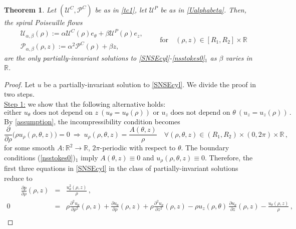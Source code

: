 \documentclass[a4paper,11pt]{amsart}
\newtheorem{theorem}{Theorem}[section]
\numberwithin{equation}{section}
\numberwithin{figure}{section}
\newcommand{\R}{\mathbb{R}}
\def\U{{\mathcal U}}
\def\P{{\mathcal P}}
\def\eq#1{(\ref{#1})}
\begin{document}
	\begin{theorem}\label{theo-tcg}
		Let $({\U^C},{\P^C})$ be as in \eqref{tc1}, let $\U^P$ be as in \eqref{Ualphabeta}. Then, the spiral Poiseuille flows 
		\begin{equation} \label{tcg}\begin{aligned}
				&\U_{\alpha,\beta}(\rho) := \alpha\U^C(\rho)e_\theta+ \beta\U^P(\rho)e_z,\\[5pt]
				& \P_{\alpha,\beta}(\rho, z) := \alpha^2\P^C(\rho)+ \beta z,\end{aligned}  \qquad \text{for} \quad (\rho,z) \in[R_1,R_2]\times \mathbb{R}\,
		\end{equation}
		are the only partially-invariant solutions  to \eqref{SNSEcyl}-\eqref{nsstokes0}$_1$ as $ \beta$ varies in $\mathbb{R}$.
		\end{theorem}
	\begin{proof} Let $u$ be a partially-invariant solution to \eqref{SNSEcyl}. We divide the proof in two steps. \\
		\underline{Step 1:} we show that the following alternative holds:
		\begin{equation}\label{either}
			\mbox{either }u_\theta\mbox{ does not depend on }z\ (u_\theta=u_\theta(\rho))
			\mbox{ or }u_z\mbox{ does not depend on }\theta\ (u_z=u_z(\rho))\, .
		\end{equation}By \eqref{assumption}, the incompressibility condition becomes
		\begin{equation}\label{incom-cylin}
			\frac{\partial}{\partial\rho}\Big(\rho u_\rho(\rho,\theta,z)\Big)=0 \ \Longrightarrow \ u_{\rho}(\rho,\theta,z)
			=\frac{A(\theta,z)}{\rho} \quad  \forall (\rho,\theta,z)\in(R_1,R_2)\times (0, 2\pi)\times \mathbb{R}\, ,
		\end{equation}
		for some smooth $A:\R^2\to\mathbb{R}$, $2\pi$-periodic with respect to $\theta$. The boundary conditions \eq{nsstokes0}$_1$ imply $A(\theta,z)\equiv0$ and $u_{\rho}(\rho, \theta, z)\equiv0$.
		Therefore, the first three equations in \eqref{SNSEcyl} in the class of partially-invariant solutions reduce to
		\begin{eqnarray}
			\qquad \frac{\partial p}{\partial \rho}(\rho, z) &=& \frac{u^{2}_{\theta}(\rho,z)}{\rho}\, ,\label{uno}\\
			0 \quad &=& \rho\frac{\partial^2 u_{\theta}}{\partial\rho^2}(\rho,z) +
			\frac{\partial u_{\theta}}{\partial\rho}(\rho,z)+\rho\frac{\partial^2 u_{\theta}}{\partial z^2}(\rho,z)
			-\rho u_z(\rho,\theta)\, \frac{\partial u_{\theta}}{\partial z}(\rho,z)- \frac{u_\theta(\rho,z)}{\rho}\, ,\label{dos}\\

\end{eqnarray}
\end{proof}
\end{document}
